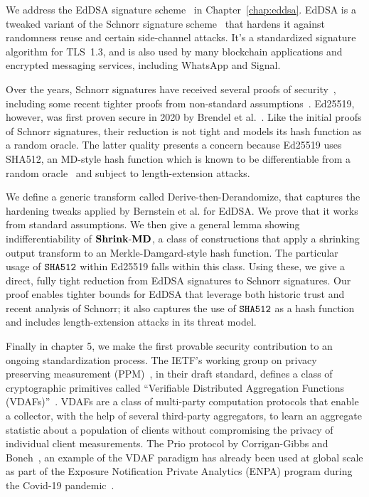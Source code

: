 We address the EdDSA signature scheme~\cite{JCEng:BDLSY12} in Chapter~\ref{chap:eddsa}. EdDSA is a tweaked variant of the Schnorr signature scheme~\cite{C:Schnorr89} that hardens it against randomness reuse and certain side-channel attacks. It's a standardized signature algorithm for TLS~1.3, and is also used by many blockchain applications and encrypted messaging services, including WhatsApp and Signal.

Over the years, Schnorr signatures have received several proofs of security~\cite{JC:PoiSte00}, including some recent tighter proofs from non-standard assumptions~\cite{INDOCRYPT:BelDai20, EC:FucPloSeu20}. Ed25519, however, was first proven secure in 2020 by Brendel et al.~\cite{SP:BCJZ21}. Like the initial proofs of Schnorr signatures, their reduction is not tight and models its hash function as a random oracle. The latter quality presents a concern because Ed25519 uses SHA512, an MD-style hash function which is known to be differentiable from a random oracle~\cite{C:CDMP05} and subject to length-extension attacks.

We define a generic transform called Derive-then-Derandomize, that captures the hardening tweaks applied by Bernstein et al. for EdDSA. We prove that it works from standard assumptions. We then give a general lemma showing indifferentiability of $\mathbf{Shrink\mbox{-}MD}$, a class of constructions that apply a shrinking output transform to an Merkle-Damgard-style hash function. The particular usage of $\texttt{SHA{512}}$ within Ed25519 falls within this class. Using these, we give a direct, fully tight reduction from EdDSA signatures to Schnorr signatures. Our proof enables tighter bounds for EdDSA that leverage both historic trust and recent analysis of Schnorr; it also captures the use of $\texttt{SHA{512}}$ as a hash function and includes length-extension attacks in its threat model.


Finally in chapter 5, we make the first provable security contribution to an ongoing standardization process.
The IETF's working group on privacy preserving measurement (PPM)~\cite{ppm}, in their draft standard, defines a class of cryptographic primitives called ``Verifiable Distributed Aggregation Functions (VDAFs)''~\cite{draft-irtf-cfrg-vdaf-03}. VDAFs are a class of multi-party computation protocols that enable a collector, with the help of several third-party aggregators, to learn an aggregate statistic about a population of clients without compromising the privacy of individual client measurements. The Prio protocol by Corrigan-Gibbs and Boneh~\cite{CGB17}, an example of the VDAF paradigm has already been used at global scale as part of the Exposure Notification Private Analytics (ENPA) program during the Covid-19 pandemic~\cite{ENPrivateAnalytics}. 

